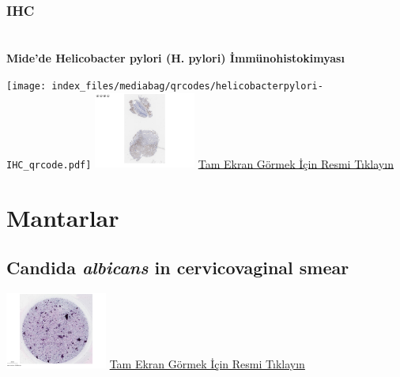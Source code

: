 \documentclass[
  letterpaper,
  DIV=11,
  numbers=noendperiod]{scrreprt}
\begin{document}
\hypertarget{section-5}{%
\chapter{}\label{section-5}}

\hypertarget{ihc}{%
\subsection{IHC}\label{ihc}}

\hypertarget{section-6}{%
\chapter{}\label{section-6}}

\textbf{Mide'de Helicobacter pylori (H. pylori) İmmünohistokimyası}

\texttt{[image: index\_files/mediabag/qrcodes/helicobacterpylori-IHC\_qrcode.pdf]}
\href{https://images.patolojiatlasi.com/helicobacterpylori/IHC.html}{\includegraphics[width=0.25\textwidth,height=\textheight]{./screenshots/thumbnail_helicobacterpyloriIHC.png}}
\href{https://images.patolojiatlasi.com/helicobacterpylori/IHC.html}{Tam
Ekran Görmek İçin Resmi Tıklayın}

\hypertarget{section-7}{%
\chapter{}\label{section-7}}

\hypertarget{sec-mantarlar}{%
\chapter{Mantarlar}\label{sec-mantarlar}}

\hypertarget{sec-candida-albicans-in-cervicovaginal-smear}{%
\section{\texorpdfstring{Candida \emph{albicans} in cervicovaginal
smear}{Candida albicans in cervicovaginal smear}}\label{sec-candida-albicans-in-cervicovaginal-smear}}

\href{https://images.patolojiatlasi.com/candidaalbicans/cervicovaginalsmear/viewer_z0.html}{\includegraphics[width=0.25\textwidth,height=\textheight]{./screenshots/thumbnail_candidaalbicans.png}}
\href{https://images.patolojiatlasi.com/candidaalbicans/cervicovaginalsmear/viewer_z0.html}{Tam
Ekran Görmek İçin Resmi Tıklayın}
\end{document}
